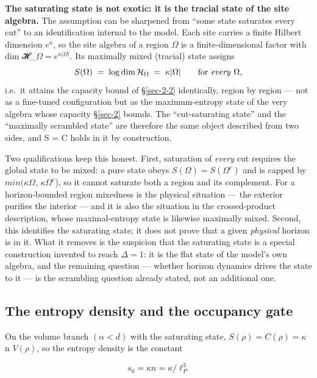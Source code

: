 \documentclass[aps,prd,preprint,nofootinbib,superscriptaddress]{revtex4-2}
\begin{document}
\textbf{The saturating state is not exotic: it is the tracial state of
the site algebra.} The assumption can be sharpened from ``some state
saturates every cut'' to an identification internal to the model. Each
site carries a finite Hilbert dimension \(e^{\kappa }\), so the site
algebra of a region \(\Omega\) is a finite-dimensional factor with dim
𝓗\_\(\Omega  = e^{\kappa |\Omega |}\). Its maximally mixed (tracial)
state assigns
\begin{equation}S(\Omega) \;=\; \log \dim \mathcal{H}_\Omega \;=\; \kappa|\Omega| \qquad \text{for \emph{every} } \Omega,\end{equation}
i.e.~it attains the capacity bound of §\ref{sec-2-2} identically, region
by region --- not as a fine-tuned configuration but as the
maximum-entropy state of the very algebra whose capacity §\ref{sec-2}
bounds. The ``cut-saturating state'' and the ``maximally scrambled
state'' are therefore the same object described from two sides, and S =
C holds in it by construction.

Two qualifications keep this honest. First, saturation of \emph{every}
cut requires the global state to be mixed: a pure state obeys
\(S(\Omega ) = S(\Omega ^{c})\) and is capped by
\(min(\kappa\)\textbar{}\(\Omega\)\textbar,
\(\kappa\)\textbar{}\(\Omega ^{c}\)\textbar), so it cannot saturate both
a region and its complement. For a horizon-bounded region mixedness is
the physical situation --- the exterior purifies the interior --- and it
is also the situation in the crossed-product description, whose
maximal-entropy state is likewise maximally mixed. Second, this
identifies the saturating state; it does not prove that a given
\emph{physical} horizon is in it. What it removes is the suspicion that
the saturating state is a special construction invented to reach
\(\Delta  = 1\): it is the flat state of the model's own algebra, and
the remaining question --- whether horizon dynamics drives the state to
it --- is the scrambling question already stated, not an additional one.

\subsection{The entropy density and the occupancy gate}\label{sec-6-2}

On the volume branch \((\alpha  < d)\) with the saturating state,
\(S(\rho ) = C(\rho ) = \kappa\) n \(V(\rho )\), so the entropy density
is the constant

\begin{equation}s_0 = \kappa n = \kappa/\ell_P^3 \tag{6.1}\end{equation}
\end{document}
